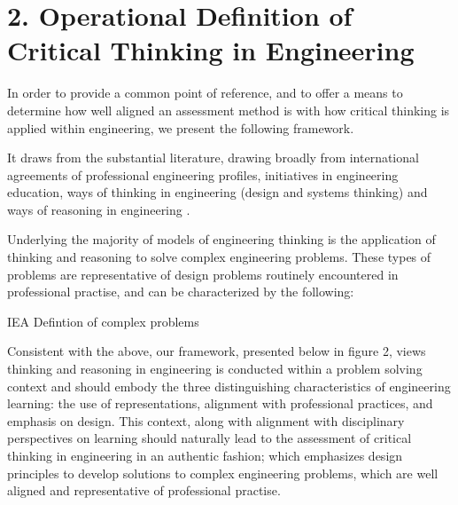 \section{2. Operational Definition of Critical Thinking in Engineering}

In order to provide a common point of reference, and to offer a means to determine how well aligned an assessment method is with how critical thinking is applied within engineering, we present the following framework.  

It draws from the substantial literature, drawing broadly from international agreements of professional engineering profiles\cite{internationalengineeringalliance}, initiatives in engineering education\cite{crawley2011cdio}, ways of thinking in engineering (design and systems thinking) \cite{Dorst:2010tc, Dym:2005gy, Frank:2001ut}and ways of reasoning in engineering \cite{Stein:2011hr, Paul:2006kv}. 

Underlying the majority of models of engineering thinking is the application of thinking and reasoning to solve complex engineering problems. These types of problems are representative of design problems routinely encountered in professional practise, and can be characterized by the following: 

{IEA Defintion of complex problems}

Consistent with the above, our framework, presented below in figure 2, views thinking and reasoning in engineering is conducted within a problem solving context and should embody the three distinguishing characteristics of engineering learning: the use of representations, alignment with professional practices, and emphasis on design\cite{Johri:2014tk}. This context, along with alignment with disciplinary perspectives on learning should naturally lead to the assessment of critical thinking in engineering in an authentic fashion; which emphasizes design principles to develop solutions to  complex engineering problems, which are well aligned and representative of professional practise.

